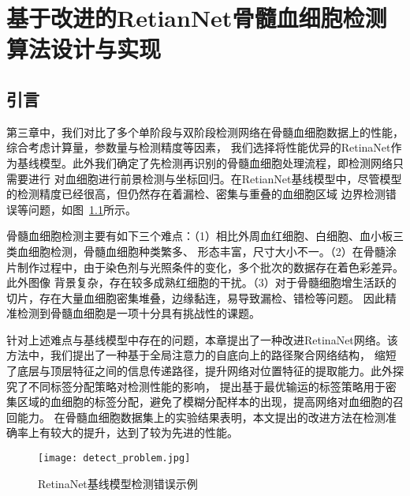
\chapter{基于改进的RetianNet骨髓血细胞检测算法设计与实现}
\section{引言}

第三章中，我们对比了多个单阶段与双阶段检测网络在骨髓血细胞数据上的性能，综合考虑计算量，参数量与检测精度等因素，
我们选择将性能优异的RetinaNet作为基线模型。此外我们确定了先检测再识别的骨髓血细胞处理流程，即检测网络只需要进行
对血细胞进行前景检测与坐标回归。在RetianNet基线模型中，尽管模型的检测精度已经很高，但仍然存在着漏检、密集与重叠的血细胞区域
边界检测错误等问题，如图~\ref{fig:detect_problem}所示。

骨髓血细胞检测主要有如下三个难点：（1）相比外周血红细胞、白细胞、血小板三类血细胞检测，骨髓血细胞种类繁多、
形态丰富，尺寸大小不一。（2）在骨髓涂片制作过程中，由于染色剂与光照条件的变化，多个批次的数据存在着色彩差异。此外图像
背景复杂，存在较多成熟红细胞的干扰。（3）对于骨髓细胞增生活跃的切片，存在大量血细胞密集堆叠，边缘黏连，易导致漏检、错检等问题。
因此精准检测到骨髓血细胞是一项十分具有挑战性的课题。

针对上述难点与基线模型中存在的问题，本章提出了一种改进RetinaNet网络。该方法中，我们提出了一种基于全局注意力的自底向上的路径聚合网络结构，
缩短了底层与顶层特征之间的信息传递路径，提升网络对位置特征的提取能力。此外探究了不同标签分配策略对检测性能的影响，
提出基于最优输运的标签策略用于密集区域的血细胞的标签分配，避免了模糊分配样本的出现，提高网络对血细胞的召回能力。
在骨髓血细胞数据集上的实验结果表明，本文提出的改进方法在检测准确率上有较大的提升，达到了较为先进的性能。

\begin{figure}[htbp]                     
  \centering                      
  \texttt{[image: detect\_problem.jpg]}                      
  \caption{RetinaNet基线模型检测错误示例}                      
  \label{fig:detect_problem}       
\end{figure}  

